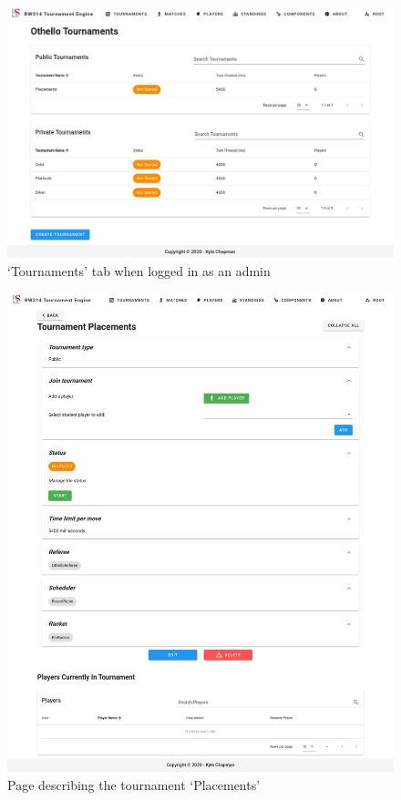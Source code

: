 \documentclass[a4paper, 11pt]{report}
\begin{document}
\begin{figure}[H]
	\centering
	\includegraphics[scale=0.33]{all-tournaments-admin.png}
	\caption{`Tournaments' tab when logged in as an admin}
	\label{fig:all-tourn-admin}
\end{figure}
\begin{figure}[H]
	\centering
	\includegraphics[scale=0.37]{tournaments-admin.png}
	\caption{Page describing the tournament `Placements'}
	\label{fig:tourn-placements}
\end{figure}
\end{document}
